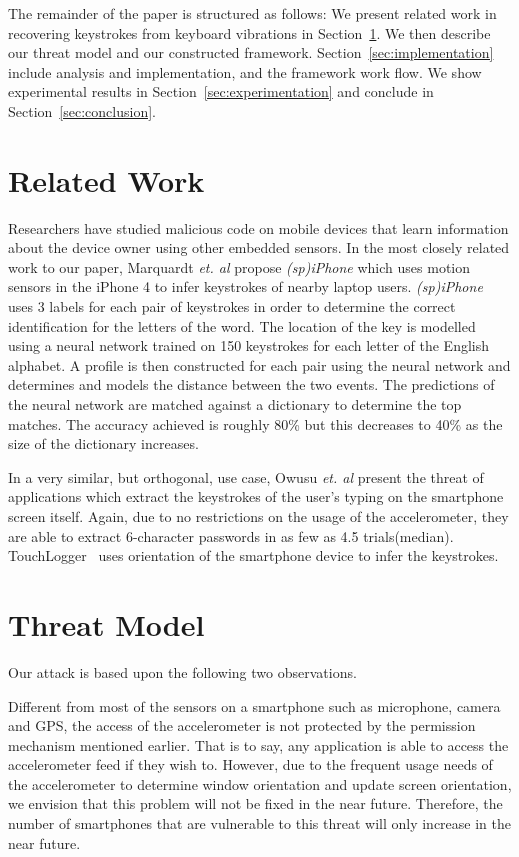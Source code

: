 \documentclass[11pt,conference]{IEEEtran}
\begin{document}
\noindent The remainder of the paper is structured as follows: 
We present related work in recovering keystrokes from keyboard vibrations in Section~\ref{sec:related}. We then describe our threat model and our constructed framework. Section~\ref{sec:implementation} include analysis and implementation, and the framework work flow. We show experimental results in Section~\ref{sec:experimentation} and conclude in Section~\ref{sec:conclusion}.

\section{Related Work}
\label{sec:related}
\noindent Researchers have studied malicious code on mobile devices that
learn information about the device owner using other embedded sensors.
In the most closely related work to our paper, Marquardt \emph{et. al}
\cite{spiphone} propose \emph{(sp)iPhone} which uses motion sensors in the
iPhone 4
to infer keystrokes of nearby laptop users. \emph{(sp)iPhone} uses 3 labels for
each pair of keystrokes in order to determine the correct identification for
the letters of the word. The location of the key is modelled using a neural
network trained on 150 keystrokes for each letter of the English alphabet.
A profile is then constructed for each pair using the neural network and
determines and models the distance between the two events. The predictions
of the neural network are matched against a dictionary to determine the top
matches. The accuracy achieved is roughly 80\% but this decreases to 40\%
as the size of the dictionary increases.

In a very similar, but orthogonal, use case, Owusu \emph{et. al}
\cite{owusu2012accessory}
present the threat of applications which extract the keystrokes of the
user's typing on the smartphone screen itself. Again, due to no restrictions
on the usage of the accelerometer, they are able to extract 6-character
passwords in as few as 4.5 trials(median). TouchLogger~\cite{cai2011touchlogger}
uses orientation of the smartphone device to infer the keystrokes.

\section{Threat Model}
\label{sec:threatmodel}
\noindent Our attack is based upon the following two observations.

Different from most of the sensors on a smartphone such as microphone, camera and GPS, the access of the accelerometer is not protected by the permission mechanism mentioned earlier. That is to say, any application is able to access the accelerometer feed if they wish to. However, due to the frequent usage needs of the accelerometer to determine window orientation and update screen orientation, we envision that this problem will not be fixed in the near future. Therefore, the number of smartphones that are vulnerable to this threat will only increase in the near future.
\end{document}
